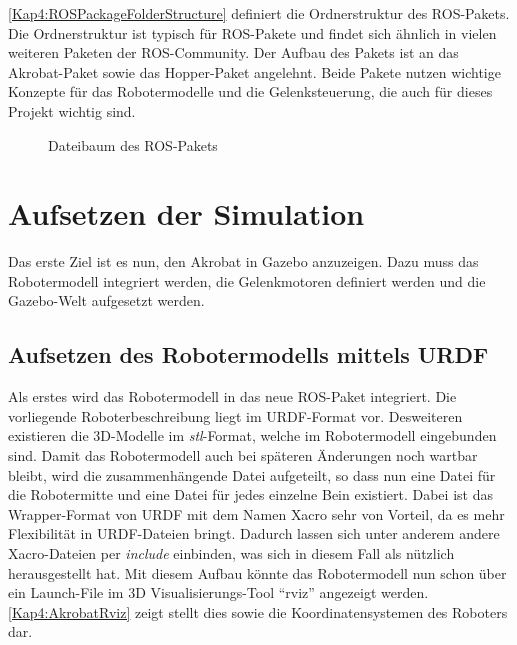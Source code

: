\autoref{Kap4:ROSPackageFolderStructure} definiert die Ordnerstruktur des \ac{ROS}-Pakets. Die Ordnerstruktur ist typisch für \ac{ROS}-Pakete und findet sich ähnlich in vielen weiteren Paketen der \ac{ROS}-Community. Der Aufbau des Pakets ist an das Akrobat-Paket \autocite{akrobat} sowie das Hopper-Paket \autocite{hopper} angelehnt. Beide Pakete nutzen wichtige Konzepte für das Robotermodelle und die Gelenksteuerung, die auch für dieses Projekt wichtig sind.

\begin{figure}[p!]
\caption{Dateibaum des ROS-Pakets}
\label{Kap4:ROSPackageFolderStructure}
\end{figure}

\section{Aufsetzen der Simulation}

Das erste Ziel ist es nun, den Akrobat in Gazebo anzuzeigen. Dazu muss das Robotermodell integriert werden, die Gelenkmotoren definiert werden und die Gazebo-Welt aufgesetzt werden.

\subsection{Aufsetzen des Robotermodells mittels \ac{URDF}}

Als erstes wird das Robotermodell in das neue \ac{ROS}-Paket integriert. Die vorliegende Roboterbeschreibung liegt im \ac{URDF}-Format vor. Desweiteren existieren die 3D-Modelle im \emph{stl}-Format, welche im Robotermodell eingebunden sind. Damit das Robotermodell auch bei späteren Änderungen noch wartbar bleibt, wird die zusammenhängende Datei aufgeteilt, so dass nun eine Datei für die Robotermitte und eine Datei für jedes einzelne Bein existiert. Dabei ist das Wrapper-Format von \ac{URDF} mit dem Namen \ac{Xacro} sehr von Vorteil, da es mehr Flexibilität in \ac{URDF}-Dateien bringt. Dadurch lassen sich unter anderem andere \ac{Xacro}-Dateien per \emph{include} einbinden, was sich in diesem Fall als nützlich herausgestellt hat. Mit diesem Aufbau könnte das Robotermodell nun schon über ein Launch-File im 3D Visualisierungs-Tool "`rviz"' angezeigt werden. \autoref{Kap4:AkrobatRviz} zeigt stellt dies sowie die Koordinatensystemen des Roboters dar.

